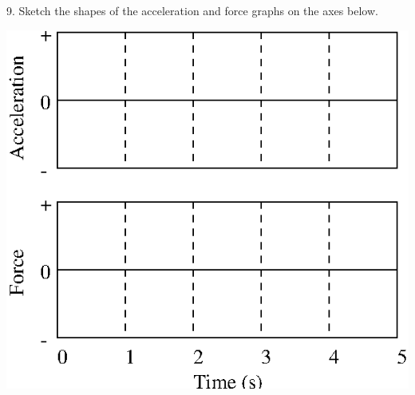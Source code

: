 9. Sketch the shapes of the acceleration and force graphs on the axes below.

\vspace{0.3cm}
{\par\centering \includegraphics{force1_fig9.eps} \par}
\vspace{0.3cm}

